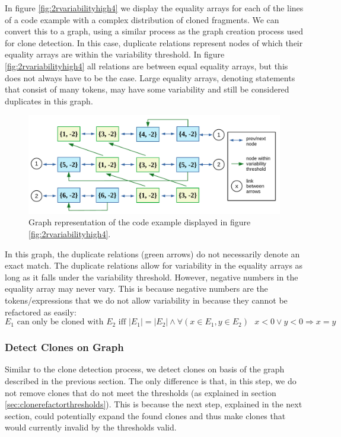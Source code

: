In figure \ref{fig:2rvariabilityhigh4} we display the equality arrays for each of the lines of a code example with a complex distribution of cloned fragments. We can convert this to a graph, using a similar process as the graph creation process used for clone detection. In this case, duplicate relations represent nodes of which their equality arrays are within the variability threshold. In figure \ref{fig:2rvariabilityhigh4} all relations are between equal equality arrays, but this does not always have to be the case. Large equality arrays, denoting statements that consist of many tokens, may have some variability and still be considered duplicates in this graph.

\begin{figure}[H]
  \centering
  \includegraphics[width=1\columnwidth]{img/T2RGraph}
  \caption{Graph representation of the code example displayed in figure \ref{fig:2rvariabilityhigh4}.}
  \label{fig:clonerefactorprocess}
\end{figure}

In this graph, the duplicate relations (green arrows) do not necessarily denote an exact match. The duplicate relations allow for variability in the equality arrays as long as it falls under the variability threshold. However, negative numbers in the equality array may never vary. This is because negative numbers are the tokens/expressions that we do not allow variability in because they cannot be refactored as easily:
\begin{equation}\label{eq:t2rcloneequality}
E_1\text{ can only be cloned with }E_2\text{ iff }|E_1|=|E_2| \land \forall (x \in E_1, y \in E_2)\text{ }x<0 \lor y<0 \Rightarrow x=y
\end{equation}

\subsubsection{Detect Clones on Graph}
Similar to the clone detection process, we detect clones on basis of the graph described in the previous section. The only difference is that, in this step, we do not remove clones that do not meet the thresholds (as explained in section \ref{sec:clonerefactorthresholds}). This is because the next step, explained in the next section, could potentially expand the found clones and thus make clones that would currently invalid by the thresholds valid.

